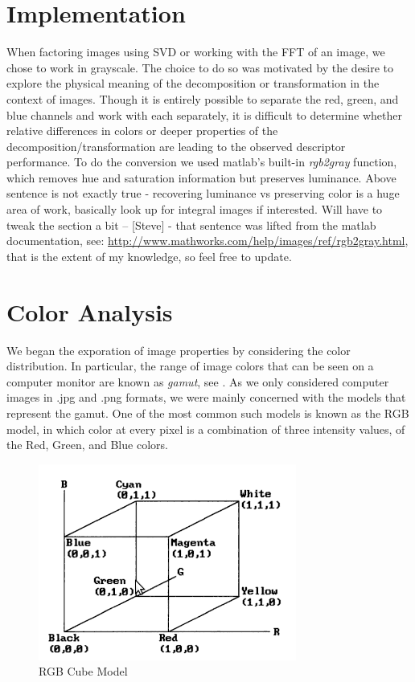 \documentclass{report}
\begin{document}
\section{Implementation}

When factoring images using SVD or working with the FFT of an image, we chose to work in grayscale. The choice to do so was motivated by the desire to explore the physical meaning of the decomposition or transformation in the context of images. Though it is entirely possible to separate the red, green, and blue channels and work with each separately, it is difficult to determine whether relative differences in colors or deeper properties of the decomposition/transformation are leading to the observed descriptor performance. To do the conversion we used matlab's built-in \textit{rgb2gray} function, which removes hue and saturation information but preserves luminance. {\color{red} Above sentence is not exactly true - recovering luminance vs preserving color is a huge area of work, basically look up for integral images if interested. Will have to tweak the section a bit -- [Steve] - that sentence was lifted from the matlab documentation, see: \url{http://www.mathworks.com/help/images/ref/rgb2gray.html}, that is the extent of my knowledge, so feel free to update.}

\section{Color Analysis}
We began the exporation of image properties by considering the color distribution. In particular, the range of image colors that can be seen on a computer monitor are known as \emph{gamut}, see \cite{color_model_ref}. As we only considered computer images in .jpg and .png formats, we were mainly concerned with the models that represent the gamut. One of the most common such models is known as the RGB model, in which color at every pixel is a combination of three intensity values, of the Red, Green, and Blue colors.  
\begin{figure}[hbtp]
\centering
\caption{RGB Cube Model}
\includegraphics[scale=0.5]{graphics/rgb_cube.png}
\end{figure}
\end{document}

